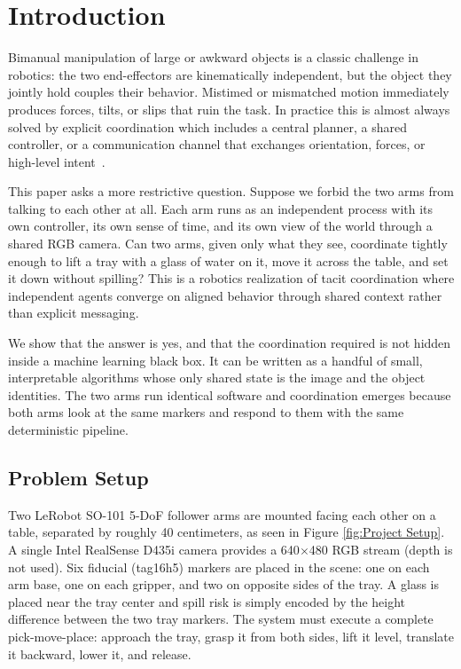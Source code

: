 \section{Introduction}

Bimanual manipulation of large or awkward objects is a classic challenge in robotics: the two end-effectors are kinematically independent, but the object they jointly hold couples their behavior. Mistimed or mismatched motion immediately produces forces, tilts, or slips that ruin the task. In practice this is almost always solved by explicit coordination which includes a central planner, a shared controller, or a communication channel that exchanges orientation, forces, or high-level intent~\cite{smith2012dualarm}.

This paper asks a more restrictive question. Suppose we forbid the two arms from talking to each other at all. Each arm runs as an independent process with its own controller, its own sense of time, and its own view of the world through a shared RGB camera. Can two arms, given only what they see, coordinate tightly enough to lift a tray with a glass of water on it, move it across the table, and set it down without spilling? This is a robotics realization of tacit coordination where independent agents converge on aligned behavior through shared context rather than explicit messaging.

We show that the answer is yes, and that the coordination required is not hidden inside a machine learning black box. It can be written as a handful of small, interpretable algorithms whose only shared state is the image and the object identities. The two arms run identical software and coordination emerges because both arms look at the same markers and respond to them with the same deterministic pipeline.

\subsection{Problem Setup}
Two LeRobot SO-101 5-DoF follower arms are mounted facing each other on a table, separated by roughly 40 centimeters, as seen in Figure \ref{fig:Project Setup}. A single Intel RealSense D435i camera provides a 640$\times$480 RGB stream (depth is not used). Six fiducial (tag16h5) markers are placed in the scene: one on each arm base, one on each gripper, and two on opposite sides of the tray. A glass is placed near the tray center and spill risk is simply encoded by the height difference between the two tray markers.
The system must execute a complete pick-move-place: approach the tray, grasp it from both sides, lift it level, translate it backward, lower it, and release.

